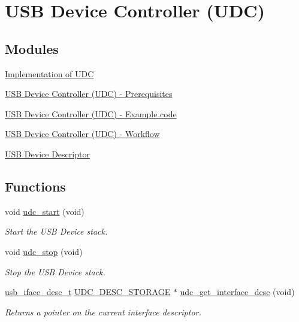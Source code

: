 \hypertarget{group__udc__group}{\section{U\-S\-B Device Controller (U\-D\-C)}
\label{group__udc__group}
}
\subsection*{Modules}
\begin{DoxyCompactItemize}
\item 
\hyperlink{group__udc__group__interne}{Implementation of U\-D\-C}
\item 
\hyperlink{group__udc__basic__use__case__setup__prereq}{U\-S\-B Device Controller (\-U\-D\-C) -\/ Prerequisites}
\item 
\hyperlink{group__udc__basic__use__case__setup__code}{U\-S\-B Device Controller (\-U\-D\-C) -\/ Example code}
\item 
\hyperlink{group__udc__basic__use__case__setup__flow}{U\-S\-B Device Controller (\-U\-D\-C) -\/ Workflow}
\item 
\hyperlink{group__udc__desc__group}{U\-S\-B Device Descriptor}
\end{DoxyCompactItemize}
\subsection*{Functions}
\begin{DoxyCompactItemize}
\item 
\hypertarget{group__udc__group_gadf4e193509cd03ab6333d62629ea51e7}{void \hyperlink{group__udc__group_gadf4e193509cd03ab6333d62629ea51e7}{udc\-\_\-start} (void)}\label{group__udc__group_gadf4e193509cd03ab6333d62629ea51e7}

\begin{DoxyCompactList}\small\item\em Start the U\-S\-B Device stack. \end{DoxyCompactList}\item 
\hypertarget{group__udc__group_gae2264dd91b24db9d4bb23fb1a2014972}{void \hyperlink{group__udc__group_gae2264dd91b24db9d4bb23fb1a2014972}{udc\-\_\-stop} (void)}\label{group__udc__group_gae2264dd91b24db9d4bb23fb1a2014972}

\begin{DoxyCompactList}\small\item\em Stop the U\-S\-B Device stack. \end{DoxyCompactList}\item 
\hyperlink{structusb__iface__desc__t}{usb\-\_\-iface\-\_\-desc\-\_\-t} \hyperlink{group__udc__desc__group_gae086959cec07a2e71ab069e25a51764f}{U\-D\-C\-\_\-\-D\-E\-S\-C\-\_\-\-S\-T\-O\-R\-A\-G\-E} $\ast$ \hyperlink{group__udc__group_gadb2a0f5ad1e834d4d7e7777f901d64d2}{udc\-\_\-get\-\_\-interface\-\_\-desc} (void)
\begin{DoxyCompactList}\small\item\em Returns a pointer on the current interface descriptor. \end{DoxyCompactList}\end{DoxyCompactItemize}


